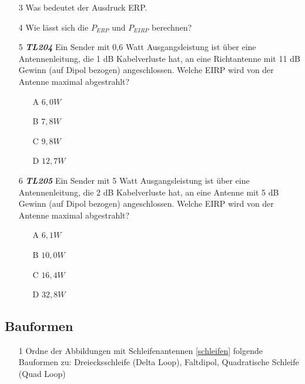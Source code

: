 \begin{enumerate} 
	\item[3] Was bedeutet der Ausdruck ERP.
	\item[4] Wie lässt sich die $P_{ERP}$ und $P_{EIRP}$ berechnen?
	\item[5] \emph{\textbf{TL204}}  Ein Sender mit 0,6 Watt Ausgangsleistung ist über eine Antennenleitung, die 1 dB Kabelverluste hat, an eine Richtantenne mit 11 dB Gewinn (auf Dipol bezogen) angeschlossen. Welche EIRP wird von der Antenne maximal abgestrahlt?
	\begin{enumerate}
	\itemsep1pt\parskip0pt
		\item[A] $6,0W$
		\item[B] $7,8W$
		\item[C] $9,8W$
		\item[D] $12,7W$
	\end{enumerate}
	\item[6] \emph{\textbf{TL205}}  Ein Sender mit 5 Watt Ausgangsleistung ist über eine Antennenleitung, die 2 dB Kabelverluste hat, an eine Antenne mit 5 dB Gewinn (auf Dipol bezogen) angeschlossen. Welche EIRP wird von der Antenne maximal abgestrahlt?
	\begin{enumerate}
	\itemsep1pt\parskip0pt
		\item[A] $6,1W$
		\item[B] $10,0W$
		\item[C] $16,4W$
		\item[D] $32,8W$
	\end{enumerate}
\end{enumerate}


\subsection*{Bauformen}

\begin{enumerate} 
\itemsep1pt\parskip0pt
\item[1] Ordne der Abbildungen mit Schleifenantennen \ref{schleifen} folgende Bauformen zu: Dreiecksschleife (Delta Loop), Faltdipol, Quadratische Schleife (Quad Loop)
\end{enumerate}

